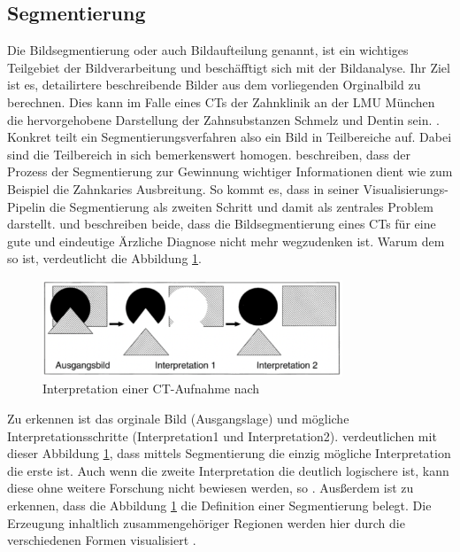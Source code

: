 \subsection{Segmentierung}
\label{subsec:segmentierung} Die Bildsegmentierung oder auch Bildaufteilung
genannt, ist ein wichtiges Teilgebiet der Bildverarbeitung und beschäfftigt sich
mit der Bildanalyse. Ihr Ziel ist es, detailirtere beschreibende Bilder aus dem vorliegenden
Orginalbild zu berechnen. Dies kann im Falle eines CTs der Zahnklinik an der LMU
München die hervorgehobene Darstellung der Zahnsubstanzen Schmelz und Dentin
sein. \citep[vgl.][Seite 359]{lehmann2013bildverarbeitung}. Konkret teilt ein
Segmentierungsverfahren also ein Bild in Teilbereiche auf. Dabei sind die Teilbereich
in sich bemerkenswert homogen. \citet[Seite 1]{ramesh2021} beschreiben, dass der
Prozess der Segmentierung zur Gewinnung wichtiger Informationen dient wie zum Beispiel
die Zahnkaries Ausbreitung. So kommt es, dass \citet[Seite 50]{handels2000} in seiner
Visualisierungs-Pipelin die Segmentierung als zweiten Schritt und damit als zentrales
Problem darstellt. \citet[Seite 95]{handels2000} und \citet[Seite 360]{lehmann2013bildverarbeitung}
beschreiben beide, dass die Bildsegmentierung eines CTs für eine gute und eindeutige
Ärzliche Diagnose nicht mehr wegzudenken ist. Warum dem so ist, verdeutlicht die
Abbildung \ref{fig:interpretation_einer_ct_aufnahem}.

\begin{figure}[h]
	\centering
	\includegraphics[width=0.8\textwidth]{img/bild_interpretation.jpg}
	\caption{Interpretation einer CT-Aufnahme nach \citet[Seite 360]{lehmann2013bildverarbeitung}}
	\label{fig:interpretation_einer_ct_aufnahem}
\end{figure}

Zu erkennen ist das orginale Bild (Ausgangslage) und mögliche
Interpretationsschritte (Interpretation1 und Interpretation2). \citet[Seite 360]{lehmann2013bildverarbeitung}
verdeutlichen mit dieser Abbildung \ref{fig:interpretation_einer_ct_aufnahem},
dass mittels Segmentierung die einzig mögliche Interpretation die erste ist. Auch
wenn die zweite Interpretation die deutlich logischere ist, kann diese ohne
weitere Forschung nicht bewiesen werden, so \citet[Seite 360]{lehmann2013bildverarbeitung}.
Ausßerdem ist zu erkennen, dass die Abbildung \ref{fig:interpretation_einer_ct_aufnahem}
die Definition einer Segmentierung belegt. Die Erzeugung inhaltlich
zusammengehöriger Regionen werden hier durch die verschiedenen Formen
visualisiert \citep[vgl.][Seite 360]{lehmann2013bildverarbeitung}.

